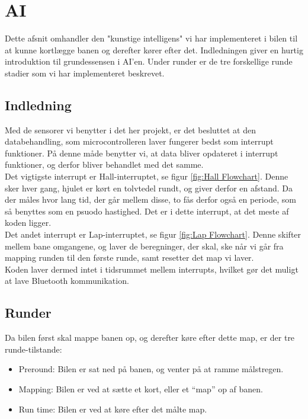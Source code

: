 \section{AI}
Dette afsnit omhandler den "kunstige intelligens" vi har implementeret i bilen til at kunne kortlægge banen og derefter kører efter det. Indledningen giver en hurtig introduktion til grundessensen i AI'en. Under runder er de tre forskellige runde stadier som vi har implementeret beskrevet.

\subsection{Indledning}
Med de sensorer vi benytter i det her projekt, er det besluttet at den databehandling, som microcontrolleren laver fungerer bedst som interrupt funktioner. På denne måde benytter vi, at data bliver opdateret i interrupt funktioner, og derfor bliver behandlet med det samme.
\\

Det vigtigste interrupt er Hall-interruptet, se figur \ref{fig:Hall Flowchart}. Denne sker hver gang, hjulet er kørt en tolvtedel rundt, og giver derfor en afstand. Da der måles hvor lang tid, der går mellem disse, to fås derfor også en periode, som så benyttes som en psuodo hastighed. Det er i dette interrupt, at det meste af koden ligger.
\\

Det andet interrupt er Lap-interruptet, se figur \ref{fig:Lap Flowchart}. Denne skifter mellem bane omgangene, og laver de beregninger, der skal, ske når vi går fra mapping runden til den første runde, samt resetter det map vi laver.
\\

Koden laver dermed intet  i tidsrummet mellem interrupts, hvilket gør det muligt at lave Bluetooth kommunikation.

\subsection{Runder}

Da bilen først skal mappe banen op, og derefter køre efter dette map, er der tre runde-tilstande:

\begin{itemize}
\item Preround: Bilen er sat ned på banen, og venter på at ramme målstregen.
\item Mapping: Bilen er ved at sætte et kort, eller et ``map'' op af banen.
\item Run time: Bilen er ved at køre efter det målte map.
\end{itemize}

